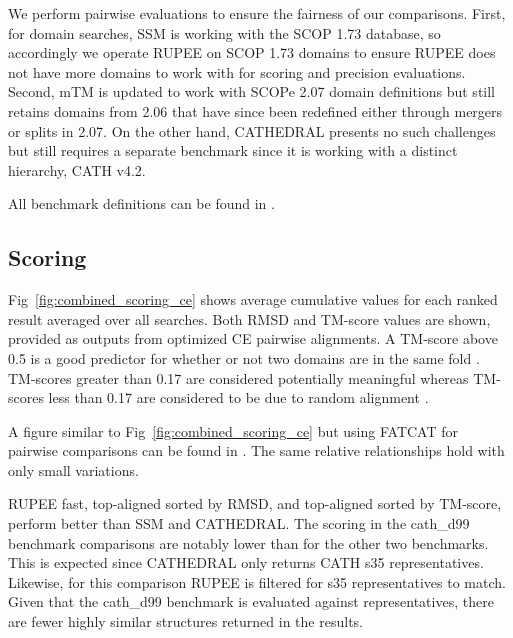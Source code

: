 \documentclass[10pt,letterpaper]{article}
\renewcommand{\figurename}{Fig}
\begin{document}
We perform pairwise evaluations to ensure the fairness of our comparisons. 
First, for domain searches, SSM is working with the SCOP 1.73 database, so accordingly we operate RUPEE on SCOP 1.73 domains to ensure RUPEE does not have more domains to work with for scoring and precision evaluations. 
Second, mTM is updated to work with SCOPe 2.07 domain definitions but still retains domains from 2.06 that have since been redefined either through mergers or splits in 2.07. 
On the other hand, CATHEDRAL presents no such challenges but still requires a separate benchmark since it is working with a distinct hierarchy, CATH v4.2. 

All benchmark definitions can be found in . 

\subsection*{Scoring}

\figurename~\ref{fig:combined_scoring_ce} shows average cumulative values for each ranked result averaged over all searches.
Both RMSD and TM-score values are shown, provided as outputs from optimized CE pairwise alignments. 
A TM-score above 0.5 is a good predictor for whether or not two domains are in the same fold \cite{Xu2010}.
TM-scores greater than 0.17 are considered potentially meaningful whereas TM-scores less than 0.17 are considered to be due to random alignment \cite{Zhang2004}.

\begin{figure*}[!h]
\caption{Scoring from CE pairwise alignments for RUPEE fast, RUPEE top-aligned sorted by TM-score, and RUPEE top-aligned sorted by RMSD}
\label{fig:combined_scoring_ce}
\end{figure*}

A figure similar to \figurename~\ref{fig:combined_scoring_ce} but using FATCAT for pairwise comparisons can be found in . 
The same relative relationships hold with only small variations. 

RUPEE fast, top-aligned sorted by RMSD, and top-aligned sorted by TM-score, perform better than SSM and CATHEDRAL.
The scoring in the cath\_d99 benchmark comparisons are notably lower than for the other two benchmarks. 
This is expected since CATHEDRAL only returns CATH s35 representatives.
Likewise, for this comparison RUPEE is filtered for s35 representatives to match. 
Given that the cath\_d99 benchmark is evaluated against representatives, there are fewer highly similar structures returned in the results. 
\end{document}
